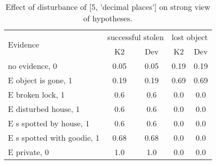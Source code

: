 \begin{table}\begin{tabular}{l|cc|cc}\toprule\multirow{2}{*}{Evidence} & \multicolumn{2}{c}{successful stolen}& \multicolumn{2}{c}{lost object}\\& {K2} & {Dev}& {K2} & {Dev}\\\midrule
no evidence, 0 & 0.05&0.05&0.19&0.19\\E object is gone, 1 & 0.19&0.19&0.69&0.69\\E broken lock, 1 & 0.6&0.6&0.0&0.0\\E disturbed house, 1 & 0.6&0.6&0.0&0.0\\E s spotted by house, 1 & 0.6&0.6&0.0&0.0\\E s spotted with goodie, 1 & 0.68&0.68&0.0&0.0\\E private, 0 & 1.0&1.0&0.0&0.0\\\bottomrule\end{tabular}\caption{Effect of disturbance of [5, 'decimal places'] on strong view of hypotheses.}\end{table}